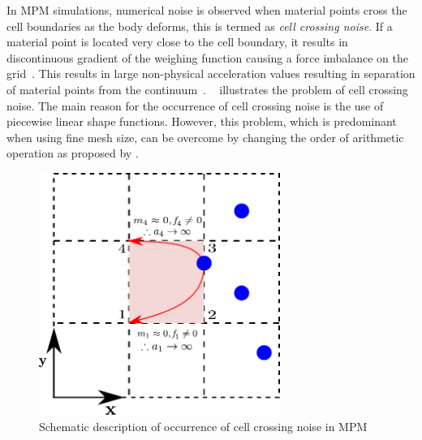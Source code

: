 In MPM simulations, numerical noise is observed when material points 
cross the cell boundaries as the body deforms, this is termed 
as \textit{cell crossing noise}. If a material point is located very close to 
the cell boundary, it results in discontinuous gradient of the weighing 
function causing a force imbalance on the grid~\citep{Bardenhagen2004}. This 
results in large non-physical acceleration values resulting in separation of 
material points from the continuum~\citep{Sulsky1995}. 
~ illustrates the problem of cell crossing noise. The 
main reason for the occurrence of cell crossing noise is the use of piecewise 
linear shape functions. However, this problem, which is predominant when using 
fine mesh size, can be overcome by changing the order of arithmetic operation 
as proposed by \citet{Sulsky1995}. 

\begin{figure}[htbp]
\centering
\includegraphics[width=0.7\textwidth]{cellnoise}
\caption{Schematic description of occurrence of cell crossing noise in MPM}
\label{fig:cellnoise}
\end{figure}

